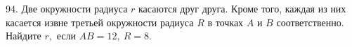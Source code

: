 94. Две окружности радиуса $r$ касаются друг друга. Кроме того, каждая из них касается извне третьей окружности радиуса $R$ в точках $A$ и $B$ соответственно. Найдите  $r,$ если $AB=12,\ R=8.$\\
